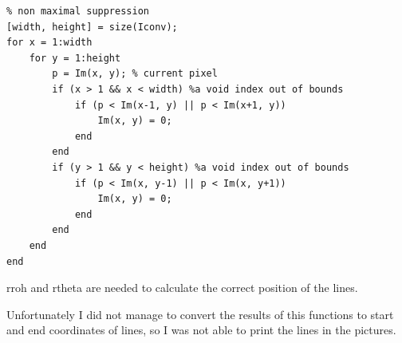 \documentclass[12pt,a4paper]{article}
\begin{document}
\begin{lstlisting}
% non maximal suppression
[width, height] = size(Iconv);
for x = 1:width
    for y = 1:height
        p = Im(x, y); % current pixel
        if (x > 1 && x < width) %a void index out of bounds
            if (p < Im(x-1, y) || p < Im(x+1, y))
                Im(x, y) = 0;
            end
        end
        if (y > 1 && y < height) %a void index out of bounds
            if (p < Im(x, y-1) || p < Im(x, y+1))
                Im(x, y) = 0;
            end
        end
    end
end

\end{lstlisting}

rroh and rtheta are needed to calculate the correct position of the lines.


Unfortunately I did not manage to convert the results of this functions to start and end coordinates of lines, so I was not able to print the lines in the pictures.

\nocite{*}


\end{document}
